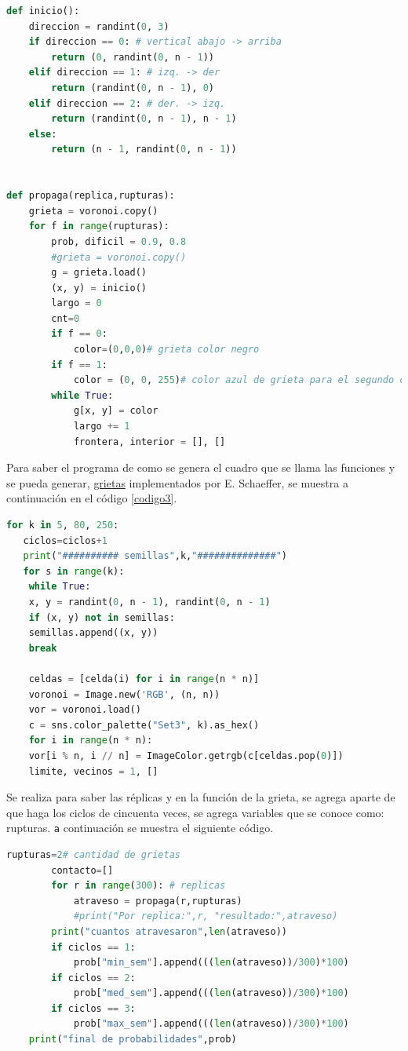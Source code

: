 \documentclass{article}
\begin{document}
\begin{lstlisting}[caption=Semillas para encontrar grietas, label=codigo2, language=Python]
def inicio():
    direccion = randint(0, 3)
    if direccion == 0: # vertical abajo -> arriba
        return (0, randint(0, n - 1))
    elif direccion == 1: # izq. -> der
        return (randint(0, n - 1), 0)
    elif direccion == 2: # der. -> izq.
        return (randint(0, n - 1), n - 1)
    else:
        return (n - 1, randint(0, n - 1))

 
def propaga(replica,rupturas):
    grieta = voronoi.copy()
    for f in range(rupturas):
        prob, dificil = 0.9, 0.8
        #grieta = voronoi.copy()
        g = grieta.load()
        (x, y) = inicio()
        largo = 0
        cnt=0
        if f == 0:
            color=(0,0,0)# grieta color negro
        if f == 1:
            color = (0, 0, 255)# color azul de grieta para el segundo ciclo
        while True:
            g[x, y] = color
            largo += 1
            frontera, interior = [], []
\end{lstlisting}

Para saber el programa de como se genera el cuadro que se llama las funciones y se pueda generar, \href{https://satuelisa.github.io/simulation/p3.html}{grietas} implementados por E. Schaeffer, se muestra a continuación en el código \ref{codigo3}.

\begin{lstlisting}[caption=Ejecuci\'on de c\'odigos, label=codigo3, language=Python]
for k in 5, 80, 250:
   ciclos=ciclos+1
   print("########## semillas",k,"##############")
   for s in range(k):
    while True:
    x, y = randint(0, n - 1), randint(0, n - 1)
    if (x, y) not in semillas:
    semillas.append((x, y))
    break
    
    celdas = [celda(i) for i in range(n * n)]
    voronoi = Image.new('RGB', (n, n))
    vor = voronoi.load()
    c = sns.color_palette("Set3", k).as_hex()
    for i in range(n * n):
    vor[i % n, i // n] = ImageColor.getrgb(c[celdas.pop(0)])
    limite, vecinos = 1, []

\end{lstlisting}

Se realiza para saber las réplicas y en la función de la grieta, se agrega aparte de que haga los ciclos de cincuenta veces, se agrega variables que se conoce como: rupturas.  \texttt a continuación se muestra el siguiente código.

\begin{lstlisting}[caption=Rupturas, label=codigo5, language=Python]
rupturas=2# cantidad de grietas
        contacto=[]
        for r in range(300): # replicas
            atraveso = propaga(r,rupturas)
            #print("Por replica:",r, "resultado:",atraveso)
        print("cuantos atravesaron",len(atraveso))
        if ciclos == 1:
            prob["min_sem"].append(((len(atraveso))/300)*100)
        if ciclos == 2:
            prob["med_sem"].append(((len(atraveso))/300)*100)
        if ciclos == 3:
            prob["max_sem"].append(((len(atraveso))/300)*100)
    print("final de probabilidades",prob)
\end{lstlisting}
\end{document}
